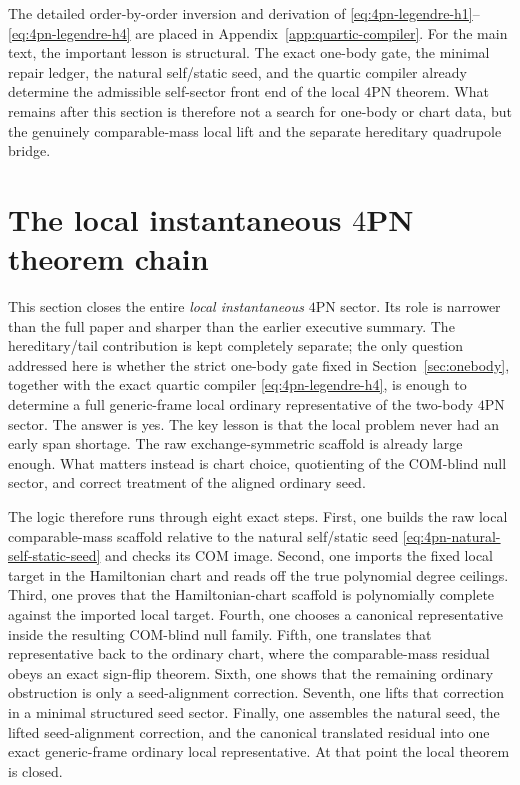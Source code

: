 \documentclass[11pt]{article}
\begin{document}
The detailed order-by-order inversion and derivation of
\eqref{eq:4pn-legendre-h1}--\eqref{eq:4pn-legendre-h4} are placed in
Appendix~\ref{app:quartic-compiler}.  For the main text, the important lesson is
structural.  The exact one-body gate, the minimal repair ledger, the natural
self/static seed, and the quartic compiler already determine the admissible
self-sector front end of the local $4$PN theorem.  What remains after this
section is therefore not a search for one-body or chart data, but the genuinely
comparable-mass local lift and the separate hereditary quadrupole bridge.


\section{The local instantaneous \texorpdfstring{$4$}{4}PN theorem chain}
\label{sec:local-chain}

This section closes the entire \emph{local instantaneous} $4$PN sector.  Its
role is narrower than the full paper and sharper than the earlier executive
summary.  The hereditary/tail contribution is kept completely separate; the
only question addressed here is whether the strict one-body gate fixed in
Section~\ref{sec:onebody}, together with the exact quartic compiler
\eqref{eq:4pn-legendre-h4}, is enough to determine a full generic-frame local
ordinary representative of the two-body $4$PN sector.  The answer is yes.  The
key lesson is that the local problem never had an early span shortage.  The raw
exchange-symmetric scaffold is already large enough.  What matters instead is
chart choice, quotienting of the COM-blind null sector, and correct treatment of
the aligned ordinary seed.

The logic therefore runs through eight exact steps.  First, one builds the raw
local comparable-mass scaffold relative to the natural self/static seed
\eqref{eq:4pn-natural-self-static-seed} and checks its COM image.  Second, one
imports the fixed local target in the Hamiltonian chart and reads off the true
polynomial degree ceilings.  Third, one proves that the Hamiltonian-chart
scaffold is polynomially complete against the imported local target.  Fourth,
one chooses a canonical representative inside the resulting COM-blind null
family.  Fifth, one translates that representative back to the ordinary chart,
where the comparable-mass residual obeys an exact sign-flip theorem.  Sixth, one
shows that the remaining ordinary obstruction is only a seed-alignment
correction.  Seventh, one lifts that correction in a minimal structured seed
sector.  Finally, one assembles the natural seed, the lifted seed-alignment
correction, and the canonical translated residual into one exact generic-frame
ordinary local representative.  At that point the local theorem is closed.
\end{document}
